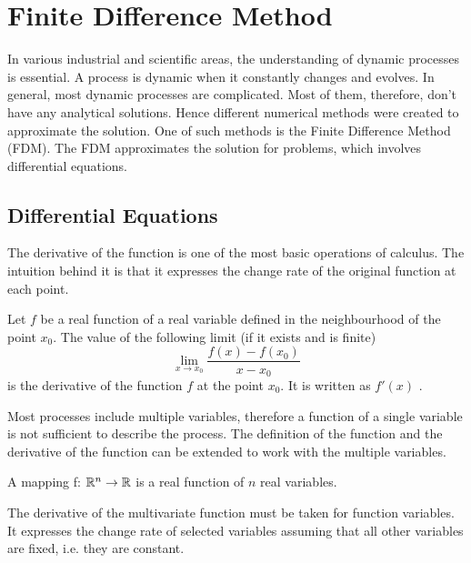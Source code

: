 \chapter{Finite Difference Method}

In various industrial and scientific areas, the understanding of dynamic processes is essential.
A process is dynamic when it constantly changes and evolves.
In general, most dynamic processes are complicated.
Most of them, therefore, don't have any analytical solutions.
Hence different numerical methods were created to approximate the solution.
One of such methods is the Finite Difference Method (FDM).
The FDM approximates the solution for problems, which involves differential equations.

\section{Differential Equations}

The derivative of the function is one of the most basic operations of calculus.
The intuition behind it is that it expresses the change rate of the original function at each point.

\begin{definition}
 Let \(f\) be a real function of a real variable defined in the neighbourhood of the point \(x_0\). The value of the following limit (if it exists and is finite)
 \begin{equation}
 \lim_{x \to x_0} \frac{f(x) - f(x_0)}{x - x_0}
 \end{equation}
is the derivative of the function \(f\) at the point \(x_0\). It is written as \(f'(x)\) \cite{OrdinaryDerivative}.
\end{definition}

Most processes include multiple variables, therefore a function of a single variable is not sufficient to describe the process.
The definition of the function and the derivative of the function can be extended to work with the multiple variables.

\begin{definition}
 A mapping f: \(\Bbb{R}^n \to \Bbb{R}\) is a real function of \(n\) real variables.
\end{definition}

The derivative of the multivariate function must be taken for function variables.
It expresses the change rate of selected variables assuming that all other variables are fixed, i.e. they are constant.


